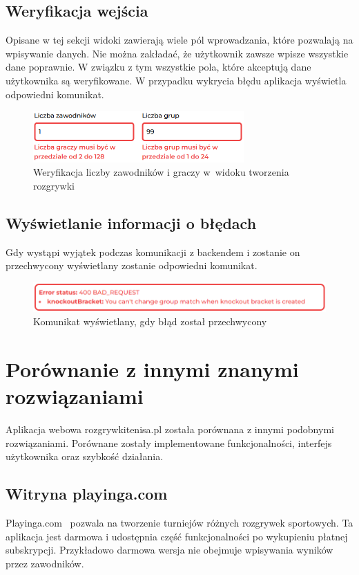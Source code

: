 \documentclass[shortabstract]{iithesis}
\begin{document}
\subsection{Weryfikacja wejścia}
Opisane w tej sekcji widoki zawierają wiele pól wprowadzania, które pozwalają na wpisywanie danych.
Nie można zakładać, że użytkownik zawsze wpisze wszystkie dane poprawnie.
W związku z tym wszystkie pola, które akceptują dane użytkownika są weryfikowane.
W przypadku wykrycia błędu aplikacja wyświetla odpowiedni komunikat.
\begin{figure}[H]
    \centering
    \includegraphics[width=0.72\textwidth,valign=t]{assets/interfejs/weryfikacja_wejscia.png}
    \caption{Weryfikacja liczby zawodników i graczy w~widoku tworzenia rozgrywki}
\end{figure}

\subsection{Wyświetlanie informacji o błędach}
Gdy wystąpi wyjątek podczas komunikacji z backendem i zostanie on przechwycony wyświetlany zostanie odpowiedni komunikat.
\begin{figure}[H]
    \centering
    \includegraphics[width=\textwidth,valign=t]{assets/interfejs/rozgrywki_error.png}
    \caption{Komunikat wyświetlany, gdy błąd został przechwycony}
\end{figure}

\section{Porównanie z innymi znanymi rozwiązaniami}
Aplikacja webowa rozgrywkitenisa.pl została porównana z innymi podobnymi rozwiązaniami.
Porównane zostały implementowane funkcjonalności, interfejs użytkownika oraz szybkość działania.

\subsection{Witryna playinga.com}
Playinga.com~\cite{Playinga} pozwala na tworzenie turniejów różnych rozgrywek sportowych. Ta aplikacja jest darmowa i udostępnia część funkcjonalności po wykupieniu płatnej subskrypcji.
Przykładowo darmowa wersja nie obejmuje wpisywania wyników przez zawodników.
\end{document}
